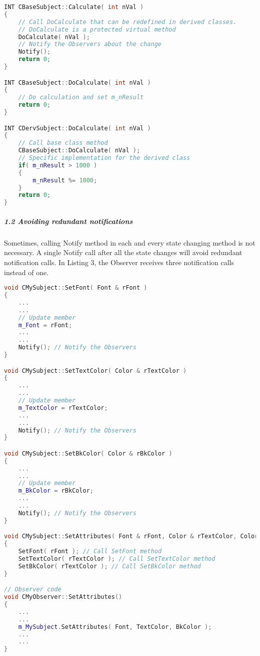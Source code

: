 \documentclass{book}
\begin{document}
\begin{lstlisting}[caption={Listing 2 - Using Template method to maintaining self consistency of the Subject},language=C++]
INT CBaseSubject::Calculate( int nVal )
{
	// Call DoCalculate that can be redefined in derived classes.
	// DoCalculate is a protected virtual method
	DoCalculate( nVal );
	// Notify the Observers about the change
	Notify();
	return 0;
}

INT CBaseSubject::DoCalculate( int nVal )
{
	// Do calculation and set m_nResult
	return 0;
}

INT CDervSubject::DoCalculate( int nVal )
{
	// Call base class method
	CBaseSubject::DoCalculate( nVal );
	// Specific implementation for the derived class
	if( m_nResult > 1000 )
	{
		m_nResult %= 1000;
	}
	return 0;
}
\end{lstlisting}


\subparagraph{1.2 Avoiding redundant notifications}

Sometimes, calling Notify method in each and every state changing method is not necessary.
A single Notify call after all the state changes will avoid redundant notification calls.
In Listing 3, the Observer receives three notification calls instead of one.

\begin{lstlisting}[caption={Listing 2 - Redundant notifications},language=C++]
void CMySubject::SetFont( Font & rFont )
{
	...
	...
	// Update member
	m_Font = rFont;
	...
	...
	Notify(); // Notify the Observers
}

void CMySubject::SetTextColor( Color & rTextColor )
{
	...
	...
	// Update member
	m_TextColor = rTextColor;
	...
	...
	Notify(); // Notify the Observers
}

void CMySubject::SetBkColor( Color & rBkColor )
{
	...
	...
	// Update member
	m_BkColor = rBkColor;
	...
	...
	Notify(); // Notify the Observers
}

void CMySubject::SetAttributes( Font & rFont, Color & rTextColor, Color & rBkColor )
{
   	SetFont( rFont ); // Call SetFont method
   	SetTextColor( rTextColor ); // Call SetTextColor method
   	SetBkColor( rTextColor ); // Call SetBkColor method
}

// Observer code
void CMyObserver::SetAttributes()
{
	...
	...
	m_MySubject.SetAttributes( Font, TextColor, BkColor );
	...
	...
}
\end{lstlisting}
\end{document}
